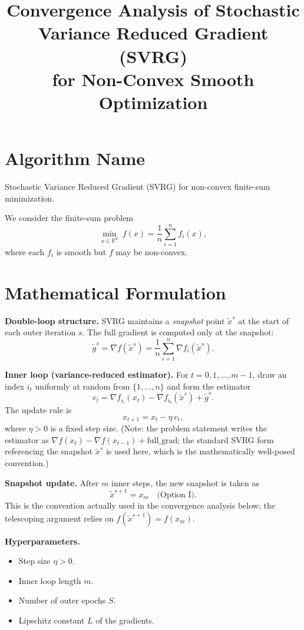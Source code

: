 \documentclass[11pt]{article}
\title{Convergence Analysis of Stochastic Variance Reduced Gradient (SVRG) \\ for Non-Convex Smooth Optimization}
\author{}
\date{}
\begin{document}
\maketitle

\section*{Algorithm Name}
Stochastic Variance Reduced Gradient (SVRG) for non-convex finite-sum minimization.

We consider the finite-sum problem
\[
\min_{x \in \mathbb{R}^d} \; f(x) = \frac{1}{n}\sum_{i=1}^{n} f_i(x),
\]
where each $f_i$ is smooth but $f$ may be non-convex.

\section*{Mathematical Formulation}

\textbf{Double-loop structure.}
SVRG maintains a \emph{snapshot} point $\tilde{x}^{s}$ at the start of each outer
iteration $s$. The full gradient is computed only at the snapshot:
\[
\tilde{g}^{s} = \nabla f(\tilde{x}^{s}) = \frac{1}{n}\sum_{i=1}^{n}\nabla f_i(\tilde{x}^{s}).
\]

\textbf{Inner loop (variance-reduced estimator).}
For $t = 0,1,\dots,m-1$, draw an index $i_t$ uniformly at random from $\{1,\dots,n\}$
and form the estimator
\[
v_t = \nabla f_{i_t}(x_t) - \nabla f_{i_t}(\tilde{x}^{s}) + \tilde{g}^{s}.
\]
The update rule is
\[
x_{t+1} = x_t - \eta\, v_t,
\]
where $\eta>0$ is a fixed step size. (Note: the problem statement writes the
estimator as $\nabla f(x_t) - \nabla f(x_{t-1}) + \text{full\_grad}$; the standard
SVRG form referencing the snapshot $\tilde{x}^{s}$ is used here, which is the
mathematically well-posed convention.)

\textbf{Snapshot update.} After $m$ inner steps, the new snapshot is taken as
\[
\tilde{x}^{s+1} = x_m \quad\text{(Option I)}.
\]
This is the convention actually used in the convergence analysis below; the
telescoping argument relies on $f(\tilde{x}^{s+1}) = f(x_m)$.

\textbf{Hyperparameters.}
\begin{itemize}
\item Step size $\eta > 0$.
\item Inner loop length $m$.
\item Number of outer epochs $S$.
\item Lipschitz constant $L$ of the gradients.
\end{itemize}
\end{document}
